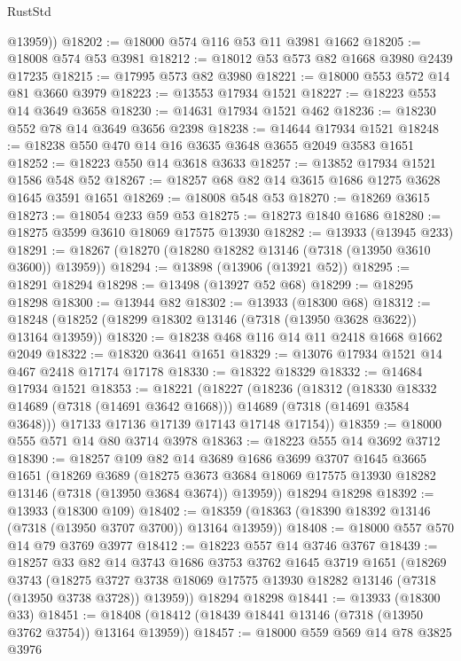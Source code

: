 \begin{lexlean}{RustStd}
\begin{coremodule}
        @13959))
@18202 := @18000 @574 @116 @53 @11 @3981 @1662
@18205 := @18008 @574 @53 @3981
@18212 := @18012 @53 @573 @82 @1668 @3980 @2439 @17235
@18215 := @17995 @573 @82 @3980
@18221 := @18000 @553 @572 @14 @81 @3660 @3979
@18223 := @13553 @17934 @1521
@18227 := @18223 @553 @14 @3649 @3658
@18230 := @14631 @17934 @1521 @462
@18236 := @18230 @552 @78 @14 @3649 @3656 @2398
@18238 := @14644 @17934 @1521
@18248 := @18238 @550 @470 @14 @16 @3635 @3648 @3655 @2049 @3583 @1651
@18252 := @18223 @550 @14 @3618 @3633
@18257 := @13852 @17934 @1521 @1586 @548 @52
@18267 := @18257 @68 @82 @14 @3615 @1686 @1275 @3628 @1645 @3591 @1651
@18269 := @18008 @548 @53
@18270 := @18269 @3615
@18273 := @18054 @233 @59 @53
@18275 := @18273 @1840 @1686
@18280 := @18275 @3599 @3610 @18069 @17575 @13930
@18282 := @13933 (@13945 @233)
@18291 := @18267 (@18270 (@18280 @18282 @13146 (@7318 (@13950 @3610 @3600)) @13959))
@18294 := @13898 (@13906 (@13921 @52))
@18295 := @18291 @18294
@18298 := @13498 (@13927 @52 @68)
@18299 := @18295 @18298
@18300 := @13944 @82
@18302 := @13933 (@18300 @68)
@18312 := @18248 (@18252 (@18299 @18302 @13146 (@7318 (@13950 @3628 @3622)) @13164 @13959))
@18320 := @18238 @468 @116 @14 @11 @2418 @1668 @1662 @2049
@18322 := @18320 @3641 @1651
@18329 := @13076 @17934 @1521 @14 @467 @2418 @17174 @17178
@18330 := @18322 @18329
@18332 := @14684 @17934 @1521
@18353 := @18221
    (@18227
      (@18236
        (@18312
          (@18330 @18332 @14689 (@7318 (@14691 @3642 @1668)))
          @14689
          (@7318 (@14691 @3584 @3648)))
        @17133
        @17136
        @17139
        @17143
        @17148
        @17154))
@18359 := @18000 @555 @571 @14 @80 @3714 @3978
@18363 := @18223 @555 @14 @3692 @3712
@18390 := @18257
    @109
    @82
    @14
    @3689
    @1686
    @3699
    @3707
    @1645
    @3665
    @1651
    (@18269
      @3689
      (@18275 @3673 @3684 @18069 @17575 @13930 @18282 @13146 (@7318 (@13950 @3684 @3674)) @13959))
    @18294
    @18298
@18392 := @13933 (@18300 @109)
@18402 := @18359 (@18363 (@18390 @18392 @13146 (@7318 (@13950 @3707 @3700)) @13164 @13959))
@18408 := @18000 @557 @570 @14 @79 @3769 @3977
@18412 := @18223 @557 @14 @3746 @3767
@18439 := @18257
    @33
    @82
    @14
    @3743
    @1686
    @3753
    @3762
    @1645
    @3719
    @1651
    (@18269
      @3743
      (@18275 @3727 @3738 @18069 @17575 @13930 @18282 @13146 (@7318 (@13950 @3738 @3728)) @13959))
    @18294
    @18298
@18441 := @13933 (@18300 @33)
@18451 := @18408 (@18412 (@18439 @18441 @13146 (@7318 (@13950 @3762 @3754)) @13164 @13959))
@18457 := @18000 @559 @569 @14 @78 @3825 @3976

\end{coremodule}
\end{lexlean}

